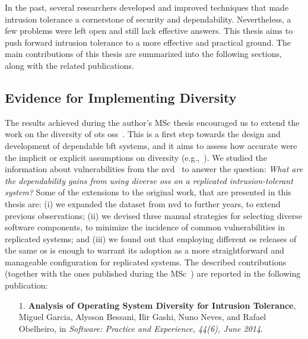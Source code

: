 In the past, several researchers developed and improved techniques that made intrusion tolerance a cornerstone of security and dependability.
Nevertheless, a few problems were left open and still lack effective answers.
This thesis aims to push forward intrusion tolerance to a more effective and practical ground.
The main contributions of this thesis are summarized into the following sections, along with the related publications.


\subsection{Evidence for Implementing Diversity}%


The results achieved during the author's MSc thesis encouraged us to extend the work on the diversity of \gls{ots} \glspl{os}~\cite{Garcia:2012}.
This is a first step towards the design and development of dependable \gls{bft} systems, and it aims to assess how accurate were the implicit or explicit assumptions on diversity (e.g.,~\cite{Abd-El-Malek:2005,Bessani:2008,Castro:2002,Castro:2003,Clement:2009,Correia:2004,Kapitza:2012,Kotla:2010,Moniz:2011,Yin:2003}).
We studied the information about vulnerabilities from the \gls{nvd}~\cite{nvd} to answer the question:
\emph{What are the dependability gains from using diverse \glspl{os} on a replicated  intrusion-tolerant system?} 
Some of the extensions to the original work, that are presented in this thesis are:
(i) we expanded the dataset from \gls{nvd} to further years, to extend previous observations;
(ii) we devised three manual strategies for selecting diverse software components, to minimize the incidence of common vulnerabilities in replicated systems; 
and (iii) we found out that employing different \gls{os} releases of the same \gls{os} is enough to warrant its adoption as a more straightforward and manageable configuration for replicated systems.
The described contributions (together with the ones published during the MSc~\cite{Garcia:2012}) are reported in the following publication:

\begin{enumerate}
\item[1.] \textbf{Analysis of Operating System Diversity for Intrusion Tolerance}, Miguel Garcia, Alysson Bessani, Ilir Gashi, Nuno Neves, and Rafael Obelheiro, in \emph{Software: Practice and Experience, 44(6), June 2014}.
\end{enumerate}




